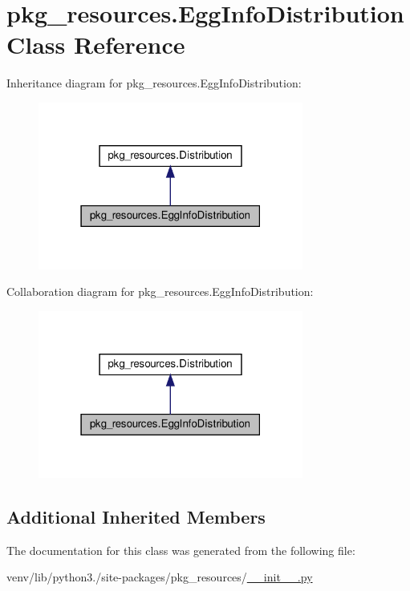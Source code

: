 \hypertarget{classpkg__resources_1_1EggInfoDistribution}{}\section{pkg\+\_\+resources.\+Egg\+Info\+Distribution Class Reference}
\label{classpkg__resources_1_1EggInfoDistribution}


Inheritance diagram for pkg\+\_\+resources.\+Egg\+Info\+Distribution\+:
\nopagebreak
\begin{figure}[H]
\begin{center}
\leavevmode
\includegraphics[width=247pt]{classpkg__resources_1_1EggInfoDistribution__inherit__graph}
\end{center}
\end{figure}


Collaboration diagram for pkg\+\_\+resources.\+Egg\+Info\+Distribution\+:
\nopagebreak
\begin{figure}[H]
\begin{center}
\leavevmode
\includegraphics[width=247pt]{classpkg__resources_1_1EggInfoDistribution__coll__graph}
\end{center}
\end{figure}
\subsection*{Additional Inherited Members}


The documentation for this class was generated from the following file\+:\begin{DoxyCompactItemize}
\item 
venv/lib/python3./site-\/packages/pkg\+\_\+resources/\hyperlink{venv_2lib_2python3_89_2site-packages_2pkg__resources_2____init_____8py}{\+\_\+\+\_\+init\+\_\+\+\_\+.\+py}\end{DoxyCompactItemize}
